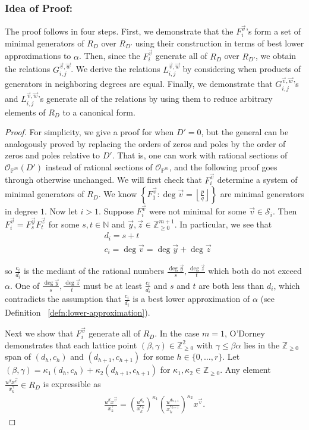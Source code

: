 \documentclass{amsart}
\theoremstyle{plain}
\theoremstyle{definition}
\theoremstyle{remark}
\numberwithin{equation}{section}
\newcommand\sssec{\subsubsection}
\newcommand\bn{{\mathbb N}}
\newcommand\bp{{\mathbb P}}
\newcommand\bz{{\mathbb Z}}
\newcommand\mss{\mathscr{S}}
\begin{document}
\sssec*{Idea of Proof:}
The proof follows in four steps. First, we demonstrate that
the $F_{i}^{\vec{v}}$'s form a set of minimal generators of $R_D$
over $R_{D'}$ using their construction in terms of best lower
approximations to $\alpha$. Then, since the $F_{i}^{\vec{v}}$ generate
all of $R_D$ over $R_{D'}$, we obtain the
relations $G_{i, j}^{\vec{v}, \vec{w}}$.
We derive the relations
$L_{i, j}^{\vec{v}, \vec{w}}$ by considering when products of
generators in neighboring degrees are equal. Finally, we demonstrate
that $G_{i, j}^{\vec{v}, \vec{w}}$'s and $L_{i, j}^{\vec{v}, \vec{w}}$'s
generate all of the relations by using them to reduce arbitrary
elements of
$R_D$ to a canonical form.

\begin{proof}
For simplicity, we give a proof for when $D' = 0$, but the general
can be analogously proved by replacing the orders of zeros and poles
by the order of zeros and poles relative to $D'$. That is,
one can work with rational sections of $\mathscr O_{\bp^m}(D')$
instead of rational sections of $\mathscr O_{\bp^m}$,
and the following proof goes through otherwise unchanged.
We will first check that $F^{\vec v}_i$ determine a system of minimal
generators of $R_D$. We know $\left\{F_{1}^{\vec{v}} : \deg \vec{v} =
\left\lfloor
\frac{p}{q} \right\rfloor \right\}$ are minimal generators in
degree $1$. Now let $i > 1$. Suppose $F_i^{\vec{v}}$ were not
minimal for some $\vec{v} \in \mss_i$. Then $F_i^{\vec{v}} =
F_{s}^{\vec{y}} F_{t}^{\vec{z}}$ for some $s, t \in \bn$ and
$\vec{y}, \vec{z} \in \bz_{ \geq 0}^{m + 1}$. In particular, we see
that 
\begin{align*}
	&d_i = s + t \\
	&c_i = \deg \vec{v} = \deg \vec{y} + \deg \vec{z}
\end{align*}

\noindent
so $\frac{c_i}{d_i}$ is the mediant of the rational numbers
$\frac{\deg \vec{y}}{s}, \frac{\deg \vec{z}}{t}$ which both
do not exceed $\alpha$. One of $\frac{\deg \vec{y}}{s},
\frac{\deg \vec{z}}{t}$ must be at least $\frac{c_i}{d_i}$
and $s$ and $t$ are both less than $d_i$, which contradicts the assumption that
$\frac{c_i}{d_i}$ is a best lower approximation of $\alpha$
(see Definition ~\ref{defn:lower-approximation}).

Next we show that $F^{\vec v}_i$ generate all of $R_D$. In the case $m = 1$, O'Dorney \cite[Theorem 6]
{dorney:canonical} demonstrates that each lattice point $(\beta, \gamma) \in
\bz_{\geq 0}^2$ with $\gamma \leq \beta \alpha$ lies in the $\bz_{\geq 0}$ span
of $(d_h, c_h)$ and $(d_{h + 1}, c_{h + 1})$ for
some $h \in \{0, \ldots, r\}$. Let $(\beta, \gamma) = \kappa_1
(d_h, c_h) + \kappa_2 (d_{h + 1}, c_{h + 1})$ for $\kappa_1, \kappa_2 \in
\bz_{\geq 0}$. Any element $\frac{u^{\beta}
x^{\vec{v}}} {x_k^{ \gamma}} \in R_D$ is expressible as
\begin{align*}
	\frac{u^{\beta} x^{\vec{v}}} {x_k^{\gamma}} = \left(\frac{u^{d_h}}
	{x_k^{c_h}}\right)^{\kappa_1} \left(\frac{u^{d_{h + 1}}}
	{x_k^{c_{h + 1}}}\right)^{\kappa_2} x^{\vec{v}}.
\end{align*}


\end{proof}
\end{document}
